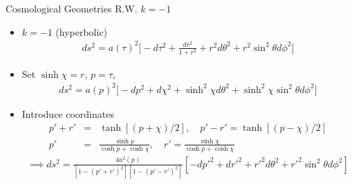 \documentclass[8pt,aspectratio=1610]{beamer}
\begin{document}
\begin{frame}{Cosmological Geometries R.W. $k=-1$}
	\begin{itemize}
		\item $k=-1$ (hyperbolic) \textcolor{white}{\cite{phelps_2019}}\textcolor{white}{\cite{amarasinghe_2019}}
		\begin{eqnarray}
		ds^2 = a(\tau)^2\bigg[-d\tau^2 + \frac{dr^2}{1+r^2}  + r^2 d\theta^2 + r^2 \sin^2\theta d\phi^2\bigg]
		\end{eqnarray}
		\item Set $\sinh\chi = r$, $p = \tau$,
		\begin{eqnarray}
		ds^2 = a(p)^2\bigg[-dp^2 + d\chi^2 + \sinh^2\chi d\theta^2 + \sinh^2\chi \sin^2\theta d\phi^2\bigg]
		\end{eqnarray} 
		\item Introduce coordinates
		\begin{eqnarray}
		p' + r' &=& \tanh[(p+\chi)/2],\quad p'-r'=\tanh[(p-\chi)/2]
		\nonumber\\
		p' &=& \frac{\sinh p}{\cosh p + \cosh \chi}, \quad r' = \frac{\sinh\chi}{\cosh p + \cosh\chi}
		\end{eqnarray}
		\begin{eqnarray}
		\implies \boxed{ds^2 = \frac{4a^2(p)}{[1-(p'+r')^2][1-(p'-r')^2]}[-dp'^2 + dr'^2 +r'^2 d\theta^2 + r'^2\sin^2\theta d\phi^2]}
		\end{eqnarray}
	\end{itemize}
\end{frame}
\end{document}

